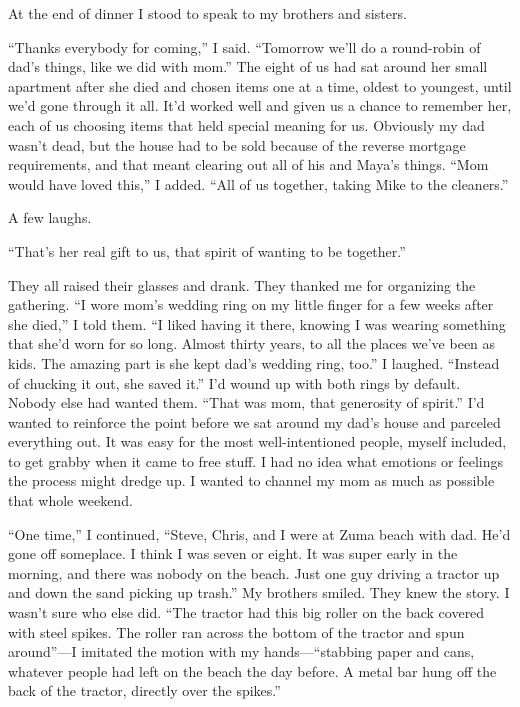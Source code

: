 \documentclass[12pt]{book}
\begin{document}
At the end of dinner I stood to speak to my brothers and sisters.

``Thanks everybody for coming,'' I said. ``Tomorrow we'll do a round-robin of dad's things, like we did with mom.'' The eight of us had sat around her small apartment after she died and chosen items one at a time, oldest to youngest, until we'd gone through it all. It'd worked well and given us a chance to remember her, each of us choosing items that held special meaning for us. Obviously my dad wasn't dead, but the house had to be sold because of the reverse mortgage requirements, and that meant clearing out all of his and Maya's things. ``Mom would have loved this,'' I added. ``All of us together, taking Mike to the cleaners.''

A few laughs.

``That's her real gift to us, that spirit of wanting to be together.''

They all raised their glasses and drank. They thanked me for organizing the gathering. ``I wore mom's wedding ring on my little finger for a few weeks after she died,'' I told them. ``I liked having it there, knowing I was wearing something that she'd worn for so long. Almost thirty years, to all the places we've been as kids. The amazing part is she kept dad's wedding ring, too.'' I laughed. ``Instead of chucking it out, she saved it.'' I'd wound up with both rings by default. Nobody else had wanted them. ``That was mom, that generosity of spirit.'' I'd wanted to reinforce the point before we sat around my dad's house and parceled everything out. It was easy for the most well-intentioned people, myself included, to get grabby when it came to free stuff. I had no idea what emotions or feelings the process might dredge up. I wanted to channel my mom as much as possible that whole weekend.

``One time,'' I continued, ``Steve, Chris, and I were at Zuma beach with dad. He'd gone off someplace. I think I was seven or eight. It was super early in the morning, and there was nobody on the beach. Just one guy driving a tractor up and down the sand picking up trash.'' My brothers smiled. They knew the story. I wasn't sure who else did. ``The tractor had this big roller on the back covered with steel spikes. The roller ran across the bottom of the tractor and spun around''---I imitated the motion with my hands---``stabbing paper and cans, whatever people had left on the beach the day before. A metal bar hung off the back of the tractor, directly over the spikes.''
\end{document}
